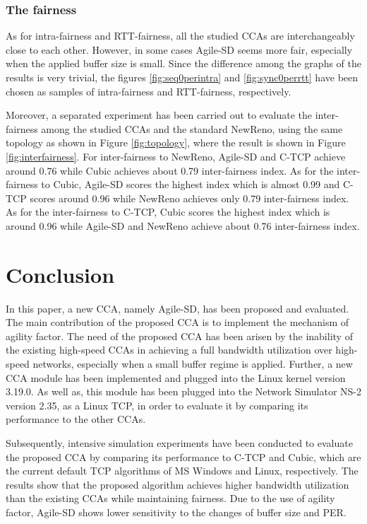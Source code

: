 \documentclass[preprint,3p,times,twocolumn,authoryear]{elsarticle}
\begin{document}
\subsubsection{The fairness}
As for intra-fairness and RTT-fairness, all the studied CCAs are interchangeably close to each other. However, in some cases Agile-SD seems more fair, especially when the applied buffer size is small. Since the difference among the graphs of the results is very trivial, the figures \ref{fig:seq0perintra} and \ref{fig:sync0perrtt} have been chosen as samples of intra-fairness and RTT-fairness, respectively.

Moreover, a separated experiment has been carried out to evaluate the inter-fairness among the studied CCAs and the standard NewReno, using the same topology as shown in Figure \ref{fig:topology}, where the result is shown in Figure \ref{fig:interfairness}. For inter-fairness to NewReno, Agile-SD and C-TCP achieve around 0.76 while Cubic achieves about 0.79 inter-fairness index. As for the inter-fairness to Cubic, Agile-SD scores the highest index which is almost 0.99 and C-TCP scores around 0.96 while NewReno achieves only 0.79 inter-fairness index. As for the inter-fairness to C-TCP, Cubic scores the highest index which is around 0.96 while Agile-SD and NewReno achieve about 0.76 inter-fairness index.

\section{Conclusion}
\label{Conc}

In this paper, a new CCA, namely Agile-SD, has been proposed and evaluated. The main contribution of the proposed CCA is to implement the mechanism of agility factor. The need of the proposed CCA has been arisen by the inability of the existing high-speed CCAs in achieving a full bandwidth utilization over high-speed networks, especially when a small buffer regime is applied. Further, a new CCA module has been implemented and plugged into the Linux kernel version 3.19.0. As well as, this module has been plugged into the Network Simulator NS-2 version 2.35, as a Linux TCP, in order to evaluate it by comparing its performance to the other CCAs. 

Subsequently, intensive simulation experiments have been conducted to evaluate the proposed CCA by comparing its performance to C-TCP and Cubic, which are the current default TCP algorithms of MS Windows and Linux, respectively. The results show that the proposed algorithm achieves higher bandwidth utilization than the existing CCAs while maintaining fairness. Due to the use of agility factor, Agile-SD shows lower sensitivity to the changes of buffer size and PER.
\end{document}
